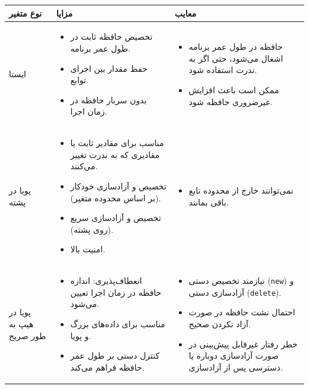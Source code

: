 \documentclass[12pt, a4paper]{report}
\begin{document}
\begin{table}[h!]
	\centering
	\begin{tabular}{|p{4cm}|p{6cm}|p{6cm}|}
		\hline
		\textbf{نوع متغیر} & \textbf{مزایا} & \textbf{معایب} \\
		\hline
		ایستا &
		\begin{itemize}
			\item تخصیص حافظه ثابت در طول عمر برنامه.
			\item حفظ مقدار بین اجرای توابع.
			\item بدون سربار حافظه در زمان اجرا.
		\end{itemize} &
		\begin{itemize}
			\item حافظه در طول عمر برنامه اشغال می‌شود، حتی اگر به ندرت استفاده شود.
			\item ممکن است باعث افزایش غیرضروری حافظه شود.
		\end{itemize} \\
		\hline
		پویا در پشته &
		\begin{itemize}
			\item مناسب برای مقادیر ثابت یا مقادیری که به ندرت تغییر می‌کنند.
			\item تخصیص و آزادسازی خودکار (بر اساس محدوده متغیر).
			\item تخصیص و آزادسازی سریع (روی پشته).
			\item امنیت بالا.
		\end{itemize} &
		\begin{itemize}
			\item نمی‌توانند خارج از محدوده تابع باقی بمانند.
		\end{itemize} \\
		\hline
		پویا در هیپ به طور صریح &
		\begin{itemize}
			\item انعطاف‌پذیری: اندازه حافظه در زمان اجرا تعیین می‌شود.
			\item مناسب برای داده‌های بزرگ و پویا.
			\item کنترل دستی بر طول عمر حافظه فراهم می‌کند.
		\end{itemize} &
		\begin{itemize}
			\item نیازمند تخصیص دستی (\texttt{new}) و آزادسازی دستی (\texttt{delete}).
			\item احتمال نشت حافظه در صورت آزاد نکردن صحیح.
			\item خطر رفتار غیرقابل پیش‌بینی در صورت آزادسازی دوباره یا دسترسی پس از آزادسازی.
		\end{itemize} \\

\end{tabular}
\end{table}
\end{document}
